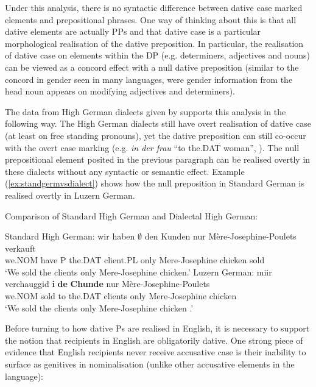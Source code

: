 	Under this analysis, there is no syntactic difference between dative case marked elements and prepositional phrases. One way of thinking about this is that all dative elements are actually PPs \citep{Bittner.1996,Caha.2009,Alexiadou.2014} and that dative case is a particular morphological realisation of the dative preposition. In particular, the realisation of dative case on elements within the DP (e.g. determiners, adjectives and nouns) can be viewed as a concord effect with a null dative preposition (similar to the concord in gender seen in many languages, were gender information from the head noun appears on modifying adjectives and determiners).

	The data from High German dialects given by \cite{Seiler.2001,Seiler.2003} supports this analysis in the following way. The High German dialects still have overt realisation of dative case (at least on free standing pronouns), yet the dative preposition can still co-occur with the overt case marking (e.g. \textit{in der frau} ``to the.DAT woman'', \citealt[ex 3]{Seiler.2001}). The null prepositional element posited in the previous paragraph can be realised overtly in these dialects without any syntactic or semantic effect. Example (\ref{ex:standgermvsdialect}) shows how the null preposition in Standard German is realised overtly in Luzern German.
\pagebreak
	\begin{exe}
		\ex Comparison of Standard High German and Dialectal High German:\label{ex:standgermvsdialect}
		\begin{xlist}
			\ex Standard High German:
			\gll wir haben $\emptyset$ den Kunden nur Mère-Josephine-Poulets verkauft\\
			we.NOM have P the.DAT client.PL only {Mere-Josephine chicken} sold\\
			\trans `We sold the clients only Mere-Josephine chicken.'
			\ex Luzern German:
			\gll miir verchauggid \textbf{i} \textbf{de} \textbf{Chunde} nur Mère-Josephine-Poulets\\
			we.NOM sold to the.DAT clients only {Mere-Josephine chicken}\\
			`We sold the clients only Mere-Josephine chicken \citep[pg. 175]{Seiler.2003}.'
		\end{xlist}
	\end{exe}

	Before turning to how dative Ps are realised in English, it is necessary to support the notion that recipients in English are obligatorily dative. One strong piece of evidence that English recipients never receive accusative case is their inability to surface as genitives in nominalisation (unlike other accusative elements in the language):

